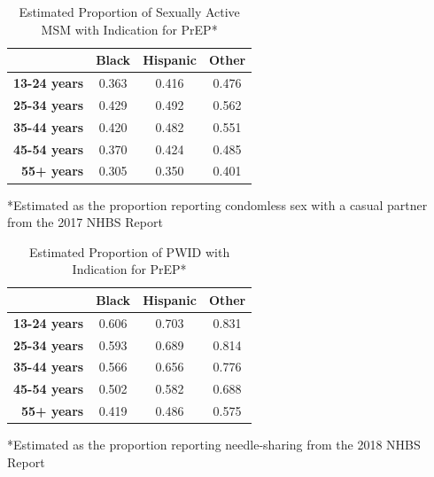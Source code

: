 \documentclass{article}
\begin{document}
\begin{table}[h!]
		\caption{Estimated Proportion of Sexually Active MSM with Indication for PrEP*}
		\label{prep_indications_msm}
		\begin{tabular}{r|c c c} 
			 & \textbf{Black} & \textbf{Hispanic} & \textbf{Other} \\
			\hline
			\textbf{13-24 years} & 0.363 & 0.416 & 0.476 \\
			\textbf{25-34 years} & 0.429 & 0.492 & 0.562 \\
			\textbf{35-44 years} & 0.420 & 0.482 & 0.551 \\
			\textbf{45-54 years} & 0.370 & 0.424 & 0.485 \\
			\textbf{55+ years} & 0.305 & 0.350 & 0.401 \\
		\end{tabular}
	\begin{flushleft}
	\footnotesize{*Estimated as the proportion reporting condomless sex with a casual partner from the 2017 NHBS Report \cite{nhbs22}}
\end{flushleft}
\end{table}

\begin{table}[h!]
		\caption{Estimated Proportion of PWID with Indication for PrEP*}
		\label{prep_indications_idu}
		\begin{tabular}{r|c c c} 
		 & \textbf{Black} & \textbf{Hispanic} & \textbf{Other} \\
			\hline
			\textbf{13-24 years} & 0.606 & 0.703 & 0.831 \\
			\textbf{25-34 years} & 0.593 & 0.689 & 0.814 \\
			\textbf{35-44 years} & 0.566 & 0.656 & 0.776 \\
			\textbf{45-54 years} & 0.502 & 0.582 & 0.688 \\
			\textbf{55+ years} & 0.419 & 0.486 & 0.575 \\
		\end{tabular}
	\begin{flushleft}
	\footnotesize{*Estimated as the proportion reporting needle-sharing from the 2018 NHBS Report \cite{nhbs24}}
\end{flushleft}
\end{table}
\end{document}
